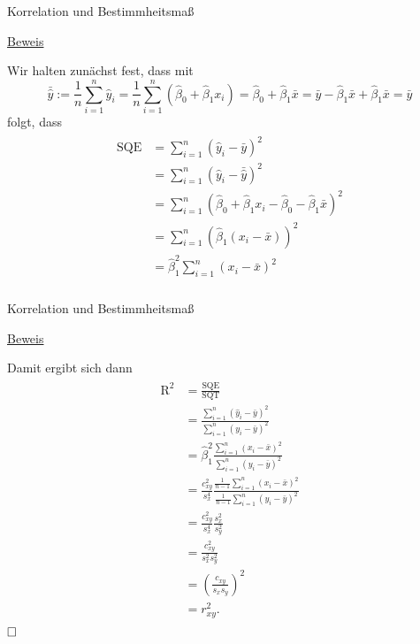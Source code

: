 \documentclass[
  8pt,
  ignorenonframetext,
]{beamer}
\begin{document}
\begin{frame}{Korrelation und Bestimmheitsmaß}
\protect\hypertarget{korrelation-und-bestimmheitsmauxdf}{}
\vspace{2mm}
\footnotesize

\underline{Beweis}

Wir halten zunächst fest, dass mit \begin{equation}
\bar{\hat{y}}
:= \frac{1}{n}\sum_{i=1}^n \hat{y}_i
= \frac{1}{n}\sum_{i=1}^n(\hat{\beta}_0 + \hat{\beta}_1x_i)
= \hat{\beta}_0 + \hat{\beta}_1\bar{x}
= \bar{y} - \hat{\beta}_1\bar{x} + \hat{\beta}_1\bar{x}
= \bar{y}
\end{equation} folgt, dass \begin{align}
\begin{split}
\mbox{SQE}
& = \sum_{i=1}^n (\hat{y}_i - \bar{y})^2            \\
& = \sum_{i=1}^n (\hat{y}_i - \bar{\hat{y}})^2      \\
& = \sum_{i=1}^n (\hat{\beta}_0 + \hat{\beta}_1x_i - \hat{\beta}_0 - \hat{\beta}_1 \bar{x})^2      \\
& = \sum_{i=1}^n (\hat{\beta}_1(x_i - \bar{x}))^2      \\
& = \hat{\beta}_1^2\sum_{i=1}^n (x_i - \bar{x})^2      \\
\end{split}
\end{align}
\end{frame}

\begin{frame}{Korrelation und Bestimmheitsmaß}
\protect\hypertarget{korrelation-und-bestimmheitsmauxdf-1}{}
\vspace{2mm}
\footnotesize

\underline{Beweis}

Damit ergibt sich dann \begin{align}
\begin{split}
\mbox{R}^2
& = \frac{\mbox{SQE}}{\mbox{SQT}}                                                 \\
& = \frac{\sum_{i=1}^n (\hat{y}_i - \bar{y})^2}{\sum_{i = 1}^n (y_i - \bar{y})^2} \\
& = \hat{\beta}_1^2\frac{\sum_{i=1}^n (x_i - \bar{x})^2}{\sum_{i = 1}^n (y_i - \bar{y})^2} \\
& = \frac{c_{xy}^2}{s_x^4} \frac{\frac{1}{n-1}\sum_{i=1}^n (x_i - \bar{x})^2}{\frac{1}{n-1}\sum_{i = 1}^n (y_i - \bar{y})^2} \\
& = \frac{c_{xy}^2}{s_x^4} \frac{s_x^2}{s_y^2} \\
& = \frac{c_{xy}^2}{s_x^2s_y^2} \\
& = \left(\frac{c_{xy}}{s_xs_y}\right)^2 \\
& = r_{xy}^2.
\end{split}
\end{align} \(\hfill\Box\)
\end{frame}
\end{document}
